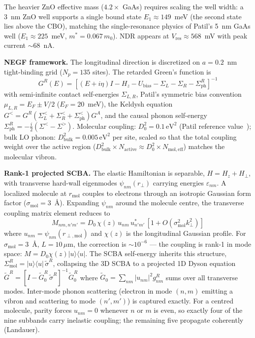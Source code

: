 \documentclass[conference]{IEEEtran}
\begin{document}
The heavier ZnO effective mass ($4.2\times$ GaAs) requires scaling the well
width: a 3~nm ZnO well supports a single bound state
$E_1 \approx 149$~meV (the second state lies above the CBO), matching the
single-resonance physics of Patil's 5~nm GaAs well
($E_1 \approx 225$~meV, $m^* = 0.067\,m_0$). NDR appears at
$V_{\mathrm{res}} \approx 568$~mV with peak current $\sim 68$~nA.

\textbf{NEGF framework.} The longitudinal direction is discretized on
$a = 0.2$~nm tight-binding grid ($N_p = 135$ sites). The retarded
Green's function is
\begin{equation}
G^R(E) = \left[(E + i\eta)I - H_z - U_{\mathrm{bias}} - \Sigma_L - \Sigma_R - \Sigma_{\mathrm{ph}}^R\right]^{-1}
\label{eq:GR}
\end{equation}
with semi-infinite contact self-energies $\Sigma_{L,R}$, Patil's symmetric
bias convention $\mu_{L,R} = E_F \pm V/2$ ($E_F = 20$~meV), the Keldysh
equation $G^< = G^R(\Sigma_L^< + \Sigma_R^< + \Sigma_{\mathrm{ph}}^<)G^A$,
and the causal phonon self-energy
$\Sigma_{\mathrm{ph}}^R = -\tfrac{i}{2}(\Sigma^< - \Sigma^>)$.
Molecular coupling: $D_0^2 = 0.1\,\mathrm{eV}^2$ (Patil reference
value~\cite{patil2018}); bulk LO phonon: $D_{\mathrm{bulk}}^2 = 0.005\,\mathrm{eV}^2$
per site, scaled so that the total coupling weight over the active region
($D_{\mathrm{bulk}}^2 \times N_{\mathrm{active}} \approx D_0^2 \times
N_{\mathrm{mol,eff}}$) matches the molecular vibron.

\textbf{Rank-1 projected SCBA.} The elastic Hamiltonian is separable,
$H = H_z + H_\perp$, with transverse hard-wall eigenmodes
$\psi_{nm}(r_\perp)$ carrying energies $\varepsilon_{nm}$.
A localized molecule at $r_{\mathrm{mol}}$ couples to electrons through an
isotropic Gaussian form factor ($\sigma_{\mathrm{mol}} = 3$~\AA). Expanding
$\psi_{nm}$ around the molecule centre, the transverse coupling matrix
element reduces to
\begin{equation}
M_{nm,n'm'} = D_0\,\chi(z)\,u_{nm}\,u^*_{n'm'}\,[1 + O(\sigma_{\mathrm{mol}}^2 k_\perp^2)]
\label{eq:rank1}
\end{equation}
where $u_{nm} = \psi_{nm}(r_{\perp,\mathrm{mol}})$ and $\chi(z)$ is the
longitudinal Gaussian profile. For $\sigma_{\mathrm{mol}} = 3$~\AA,
$L = 10\,\mu$m, the correction is $\sim 10^{-6}$ --- the coupling is
rank-1 in mode space: $M = D_0\chi(z)|u\rangle\langle u|$. The SCBA
self-energy inherits this structure,
$\Sigma^R_{\mathrm{mol}} = |u\rangle\langle u|\,\tilde\sigma^R$,
collapsing the 3D SCBA to a projected 1D Dyson equation
$\tilde G^R = [I - \tilde G_0^R\,\tilde\sigma^R]^{-1}\tilde G_0^R$
where $\tilde G_0 = \sum_{nm}|u_{nm}|^2 g_{nm}^R$ sums over all
transverse modes. Inter-mode phonon scattering (electron in mode $(n,m)$
emitting a vibron and scattering to mode $(n',m')$) is captured exactly.
For a centred molecule, parity forces $u_{nm} = 0$ whenever $n$ or $m$
is even, so exactly four of the nine subbands carry inelastic coupling;
the remaining five propagate coherently (Landauer).
\end{document}
